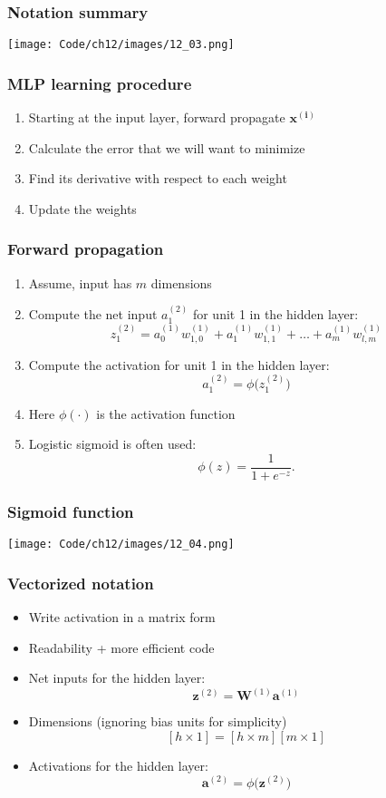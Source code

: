 \documentclass{beamer}
\begin{document}
\begin{frame}
  \frametitle{Notation summary}
  \texttt{[image: Code/ch12/images/12\_03.png]}  
\end{frame}

\begin{frame}
  \frametitle{MLP learning procedure}
  \begin{enumerate}
  \item Starting at the input layer, forward propagate $\mathbf{x^{(i)}}$
  \item Calculate the error that we will want to minimize
  \item Find its derivative with respect to each weight
  \item Update the weights
  \end{enumerate}
\end{frame}

\begin{frame}
  \frametitle{Forward propagation}
  \begin{enumerate}
  \item Assume, input has $m$ dimensions
    \item Compute the net input $a_{1}^{(2)}$ for unit 1 in the hidden layer:
      \[
      z_{1}^{(2)} = a_{0}^{(1)} w_{1,0}^{(1)} + a_{1}^{(1)} w_{1, 1}^{(1)} + \dots + a_{m}^{(1)} w_{l, m}^{(1)}
      \]
    \item Compute the activation for unit 1 in the hidden layer:
      \[
      a_{1}^{(2)} = \phi \big( z_{1}^{(2)} \big)
      \]
    \item Here $\phi(\cdot)$ is the activation function
    \item Logistic sigmoid is often used:
      \[
      \phi(z) = \frac{1}{1 + e^{-z}}.
      \]
  \end{enumerate}
\end{frame}

\begin{frame}
  \frametitle{Sigmoid function}
  \center
  \texttt{[image: Code/ch12/images/12\_04.png]}  
\end{frame}

\begin{frame}
  \frametitle{Vectorized notation}
  \begin{itemize}
  \item Write activation in a matrix form
  \item Readability + more efficient code
  \item Net inputs for the hidden layer:
    \[
    \mathbf{z}^{(2)} = \mathbf{W}^{(1)} \mathbf{a}^{(1)}
    \]
  \item Dimensions (ignoring bias units for simplicity)
    \[
    [h \times 1] = [h \times m] [m \times 1]
    \]
  \item Activations for the hidden layer:
    \[
    \mathbf{a}^{(2)} = \phi \big( \mathbf{z}^{(2)} \big)
    \]
  \end{itemize}
\end{frame}
\end{document}
